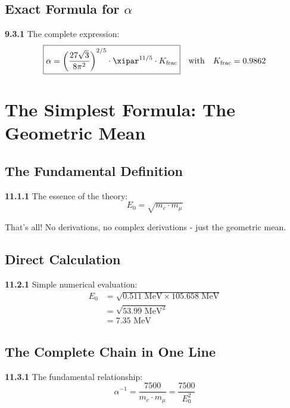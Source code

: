 \subsection{Exact Formula for $\alpha$}

\noindent \textbf{9.3.1} The complete expression:
\begin{equation}
	\boxed{\alpha = \left( \frac{27 \sqrt{3}}{8 \pi^2} \right)^{2/5} \cdot \xipar^{11/5} \cdot K_{\text{frac}}}
	\quad \text{with} \quad K_{\text{frac}} = 0.9862
\end{equation}

\section{The Simplest Formula: The Geometric Mean}

\subsection{The Fundamental Definition}

\begin{tcolorbox}[colback=yellow!10!white,colframe=red!75!black,title=\textbf{THE SIMPLEST FORMULA}]
	\noindent \textbf{11.1.1} The essence of the theory:
	\begin{equation}
		\boxed{E_0 = \sqrt{m_e \cdot m_\mu}}
	\end{equation}
	
	That's all! No derivations, no complex derivations - just the geometric mean.
\end{tcolorbox}

\subsection{Direct Calculation}

\noindent \textbf{11.2.1} Simple numerical evaluation:
\begin{align}
	E_0 &= \sqrt{0.511 \text{ MeV} \times 105.658 \text{ MeV}} \\
	&= \sqrt{53.99 \text{ MeV}^2} \\
	&= 7.35 \text{ MeV}
\end{align}

\subsection{The Complete Chain in One Line}

\noindent \textbf{11.3.1} The fundamental relationship:
\begin{equation}
	\boxed{\alpha^{-1} = \frac{7500}{m_e \cdot m_\mu} = \frac{7500}{E_0^2}}
\end{equation}

